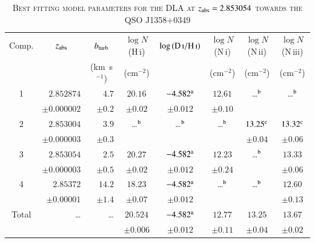 \documentclass[12pt,preprint,useAMS,usenatbib]{emulateapj}
\begin{document}
\begin{table}
\centering
\begin{minipage}[c]{0.6\textwidth}
    \caption{\textsc{Best fitting model parameters for the DLA at $z_{\rm abs}=2.853054$ towards the QSO J1358$+$0349}}
    \hspace{-0.6cm}\begin{tabular}{@{}crrccccc}
    \hline
   \multicolumn{1}{c}{Comp.}
& \multicolumn{1}{c}{$z_{\rm abs}$} 
& \multicolumn{1}{c}{$b_{\rm turb}$} 
& \multicolumn{1}{c}{$\log N$\/(H\,{\sc i})}
& \multicolumn{1}{c}{$\log {\rm (D\,\textsc{i}/H\,\textsc{i})}$}
& \multicolumn{1}{c}{$\log N$\/(N\,{\sc i})}
& \multicolumn{1}{c}{$\log N$\/(N\,{\sc ii})}
& \multicolumn{1}{c}{$\log N$\/(N\,{\sc iii})}\\
    \multicolumn{1}{c}{}
& \multicolumn{1}{c}{}
& \multicolumn{1}{c}{(km~s$^{-1}$)}
& \multicolumn{1}{c}{(cm$^{-2}$)}
& \multicolumn{1}{c}{}
& \multicolumn{1}{c}{(cm$^{-2}$)}
& \multicolumn{1}{c}{(cm$^{-2}$)}
& \multicolumn{1}{c}{(cm$^{-2}$)}\\
  \hline
1  & $2.852874$                     & $4.7$             & $20.16$         & $-4.582^{\rm a}$         &  $12.61$          &  \ldots$^{\rm b}$&  \ldots$^{\rm b}$   \\
    &  $\pm 0.000002$            &$\pm 0.2$       & $\pm 0.02$    & $\pm 0.012$                &  $\pm  0.10$  &                        &    \\
2  & $2.853004$                  & $3.9$             & \ldots$^{\rm b}$ & \ldots$^{\rm b}$         &  \ldots$^{\rm b}$ & $13.25^{\rm c}$        &  $13.32^{\rm c}$  \\
    &  $\pm 0.000003$                &$\pm 0.3$     &                          &                                        &                          &  $\pm0.04$  &  $\pm0.06$  \\
3  & $2.853054$                  & $2.5$             & $20.27$          & $-4.582^{\rm a}$         &  $12.23$        &  \ldots$^{\rm b}$&  $13.33$  \\
    &  $\pm 0.000003$        &$\pm 0.5$      & $\pm 0.02$    & $\pm 0.012$                &  $\pm0.24$    &                        &  $\pm0.06$  \\
4  & $2.85372$                      & $14.2$          & $18.23$          & $-4.582^{\rm a}$         &  \ldots$^{\rm b}$ &  \ldots$^{\rm b}$ &  $12.60$   \\
    &  $\pm 0.00001$            &$\pm 1.4$      & $\pm 0.07$     & $\pm 0.012$                &                        &                         &  $\pm0.13$    \\
Total  & \ldots                  & \ldots          & $20.524$          & $-4.582^{\rm a}$         &  $12.77$             &  $13.25$             &  $13.67$   \\
    &         &                                                   & $\pm 0.006$     & $\pm 0.012$                &    $\pm0.11$     &       $\pm 0.04$   &  $\pm0.02$    \\
  \hline
    \end{tabular}


\end{minipage}
\end{table}
\end{document}
